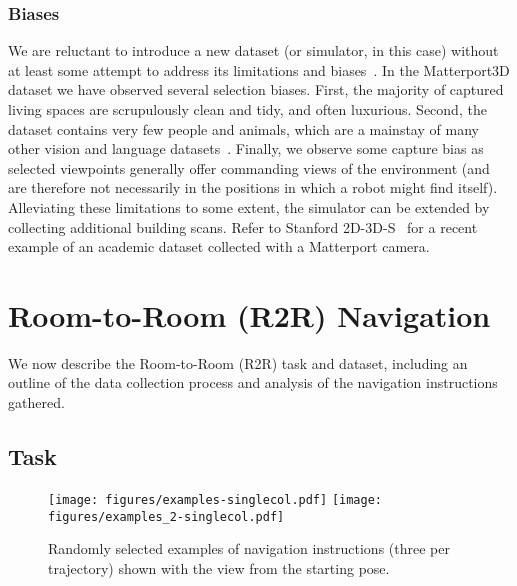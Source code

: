 \documentclass[10pt,twocolumn,letterpaper]{article}
\begin{document}
\subsubsection{Biases}

We are reluctant to introduce a new dataset (or simulator, in this case) without at least some attempt to address its limitations and biases~\cite{torralba2011unbiased}. In the Matterport3D dataset we have observed several selection biases. First, the majority of captured living spaces are scrupulously clean and tidy, and often luxurious. Second, the dataset contains very few people and animals, which are a mainstay of many other vision and language datasets~\cite{Chen2015,VQA}. Finally, we observe some capture bias as selected viewpoints generally offer commanding views of the environment (and are therefore not necessarily in the positions in which a robot might find itself). Alleviating these limitations to some extent, the simulator can be extended by collecting additional building scans. Refer to Stanford 2D-3D-S~\cite{2017arXiv170201105A} for a recent example of an academic dataset collected with a Matterport camera. 


 \section{Room-to-Room (R2R) Navigation}
\label{sec:dataset}

We now describe the Room-to-Room (R2R) task and dataset, including an outline of the data collection process and analysis of the navigation instructions gathered. 

\subsection{Task}

\begin{figure}[t]
	\begin{center}
		\texttt{[image: figures/examples-singlecol.pdf]}
		\texttt{[image: figures/examples\_2-singlecol.pdf]}
	\end{center}
	\caption{Randomly selected examples of navigation instructions (three per trajectory) shown with the view from the starting pose.}
	\label{fig:examples}
\end{figure}
\end{document}
